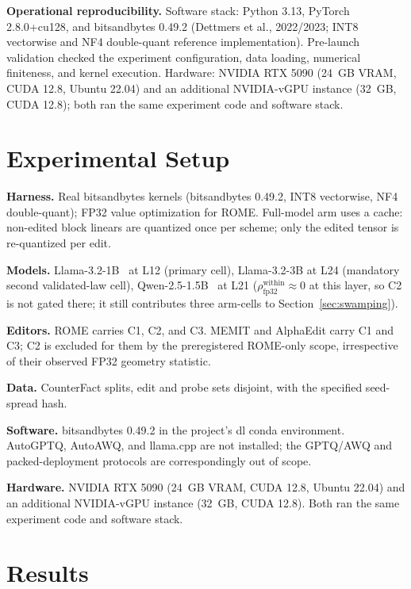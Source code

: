 \documentclass[preprint,12pt]{elsarticle}
\begin{document}
\textbf{Operational reproducibility.} Software stack: Python 3.13, PyTorch
2.8.0+cu128, and bitsandbytes 0.49.2 (Dettmers et al., 2022/2023; INT8 vectorwise
and NF4 double-quant reference implementation). Pre-launch validation checked the
experiment configuration, data loading, numerical finiteness, and kernel execution.
Hardware: NVIDIA RTX 5090 (24~GB VRAM, CUDA 12.8, Ubuntu 22.04) and an additional
NVIDIA-vGPU instance (32~GB, CUDA 12.8); both ran the same experiment code and
software stack.

\section{Experimental Setup}
\label{sec:setup}

\textbf{Harness.} Real bitsandbytes kernels (bitsandbytes 0.49.2, INT8 vectorwise, NF4
double-quant); FP32 value optimization for ROME. Full-model arm uses a cache: non-edited
block linears are quantized once per scheme; only the edited tensor is re-quantized per
edit.

\textbf{Models.} Llama-3.2-1B~\cite{llama3herd2024} at L12 (primary cell), Llama-3.2-3B
at L24 (mandatory second validated-law cell), Qwen-2.5-1.5B~\cite{qwen252024} at L21
($\rho_{\mathrm{fp32}}^{\mathrm{within}} \approx 0$ at this layer, so C2 is not gated
there; it still contributes three arm-cells to Section~\ref{sec:swamping}).

\textbf{Editors.} ROME carries C1, C2, and C3. MEMIT and AlphaEdit carry C1 and C3;
C2 is excluded for them by the preregistered ROME-only scope, irrespective of their
observed FP32 geometry statistic.

\textbf{Data.} CounterFact splits, edit and probe sets disjoint, with the specified
seed-spread hash.

\textbf{Software.} bitsandbytes 0.49.2 in the project's dl conda environment.
AutoGPTQ, AutoAWQ, and llama.cpp are not installed; the GPTQ/AWQ and
packed-deployment protocols are correspondingly out of scope.

\textbf{Hardware.} NVIDIA RTX 5090 (24~GB VRAM, CUDA 12.8, Ubuntu 22.04) and an
additional NVIDIA-vGPU instance (32~GB, CUDA 12.8). Both ran the same experiment
code and software stack.

\section{Results}
\label{sec:results}
\end{document}
